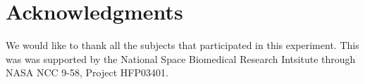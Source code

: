 \documentclass[]{aiaa-tc}%
\begin{document}
\section*{Acknowledgments}
We would like to thank all the subjects that participated in this experiment. This was was supported by the National Space Biomedical Research Intsitute through NASA NCC 9-58, Project HFP03401.



\end{document}
